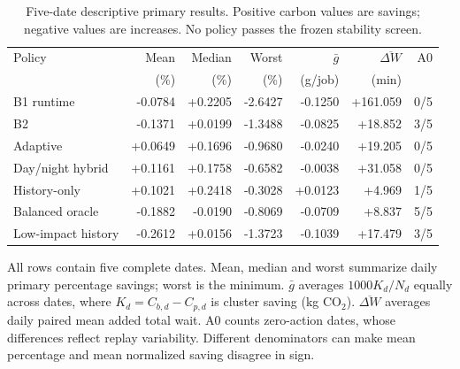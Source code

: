 \begin{table}[htbp]
\centering\small
\setlength{\tabcolsep}{3pt}\renewcommand{\arraystretch}{1.2}
\caption[Five-date primary policy summary]{Five-date descriptive primary results. Positive carbon values are savings; negative values are increases. No policy passes the frozen stability screen.}
\label{tab:final-policy-summary}
\begin{tabular}{@{}lrrrrrr@{}}\toprule
Policy & Mean & Median & Worst & $\bar g$ & $\overline{\Delta W}$ & A0 \\
 & (\%) & (\%) & (\%) & (g/job) & (min) & \\ \midrule
B1 runtime & -0.0784 & +0.2205 & -2.6427 & -0.1250 & +161.059 & 0/5 \\
B2 & -0.1371 & +0.0199 & -1.3488 & -0.0825 & +18.852 & 3/5 \\
Adaptive & +0.0649 & +0.1696 & -0.9680 & -0.0240 & +19.205 & 0/5 \\
Day/night hybrid & +0.1161 & +0.1758 & -0.6582 & -0.0038 & +31.058 & 0/5 \\
History-only & +0.1021 & +0.2418 & -0.3028 & +0.0123 & +4.969 & 1/5 \\
Balanced oracle & -0.1882 & -0.0190 & -0.8069 & -0.0709 & +8.837 & 5/5 \\
Low-impact history & -0.2612 & +0.0156 & -1.3723 & -0.1039 & +17.479 & 3/5 \\
\bottomrule\end{tabular}
\par\smallskip\begin{minipage}{\linewidth}\footnotesize All rows contain five complete dates. Mean, median and worst summarize daily primary percentage savings; worst is the minimum. $\bar g$ averages $1000K_d/N_d$ equally across dates, where $K_d=C_{b,d}-C_{p,d}$ is cluster saving (kg CO$_2$). $\overline{\Delta W}$ averages daily paired mean added total wait. A0 counts zero-action dates, whose differences reflect replay variability. Different denominators can make mean percentage and mean normalized saving disagree in sign.
\end{minipage}\end{table}
